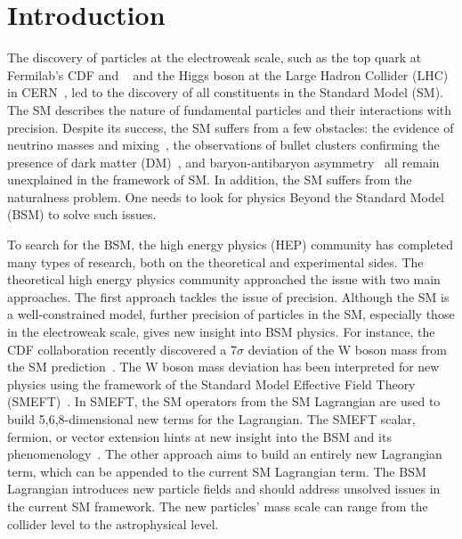 \chapter{Introduction}\label{sec:introduction}

The discovery of particles at the electroweak scale, such as the top quark at Fermilab's CDF and \DZERO~\cite{topD0,topCDF} and the Higgs boson at the Large Hadron Collider (LHC) in CERN~\cite{higgscms,higgsatlas}, led to the discovery of all constituents in the Standard Model (SM).
The SM describes the nature of fundamental particles and their interactions with precision.
Despite its success, the SM suffers from a few obstacles:
the evidence of neutrino masses and mixing~\cite{neutrino}, the observations of bullet clusters confirming the presence of dark matter (DM)~\cite{Baumgart:2009tn,Kaplan:2009ag,Chan:2011aa,Dienes:2011ja,Dienes:2012yz}, and baryon-antibaryon asymmetry~\cite{Cui:2014twa} all remain unexplained in the framework of SM.
In addition, the SM suffers from the naturalness problem.
One needs to look for physics Beyond the Standard Model (BSM) to solve such issues.

To search for the BSM, the high energy physics (HEP) community has completed many types of research, both on the theoretical and experimental sides.
The theoretical high energy physics community approached the issue with two main approaches.
The first approach tackles the issue of precision.
Although the SM is a well-constrained model, further precision of particles in the SM, especially those in the electroweak scale, gives new insight into BSM physics.
For instance, the CDF collaboration recently discovered a 7$\sigma$ deviation of the W boson mass from the SM prediction~\cite{Aaltonen:2022aaa}.
The W boson mass deviation has been interpreted for new physics using the framework of the Standard Model Effective Field Theory (SMEFT)~\cite{Mishima:2022aab}.
In SMEFT, the SM operators from the SM Lagrangian are used to build 5,6,8-dimensional new terms for the Lagrangian.
The SMEFT scalar, fermion, or vector extension hints at new insight into the BSM and its phenomenology~\cite{Mishima:2022aab}.
The other approach aims to build an entirely new Lagrangian term, which can be appended to the current SM Lagrangian term.
The BSM Lagrangian introduces new particle fields and should address unsolved issues in the current SM framework.
The new particles' mass scale can range from the collider level to the astrophysical level.






